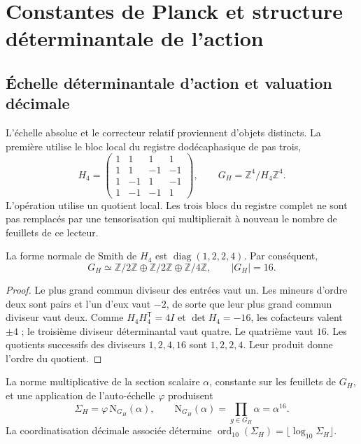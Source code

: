 \section{Constantes de Planck et structure déterminantale de l'action}
\label{v:ant:sec:action}
\subsection{Échelle déterminantale d'action et valuation décimale}

L'échelle absolue et le correcteur relatif proviennent d'objets
distincts. La première utilise le bloc local du registre dodécaphasique
de pas trois,
\begin{equation}
 H_4=\begin{pmatrix}
 1&1&1&1\\1&1&-1&-1\\1&-1&1&-1\\1&-1&-1&1
 \end{pmatrix},\qquad
 G_H=\mathbb Z^4/H_4\mathbb Z^4.
 \label{v:ant:eq:el-h4}
\end{equation}
L'opération utilise un quotient local. Les trois blocs du registre
complet ne sont pas remplacés par une tensorisation qui multiplierait à
nouveau le nombre de feuillets de ce lecteur.

\begin{lemma}
La forme normale de Smith de \(H_4\) est
\(\operatorname{diag}(1,2,2,4)\). Par conséquent,
\[
 G_H\simeq\mathbb Z/2\mathbb Z\oplus\mathbb Z/2\mathbb Z
 \oplus\mathbb Z/4\mathbb Z,\qquad |G_H|=16.
\]
\end{lemma}
\begin{proof}
Le plus grand commun diviseur des entrées vaut un. Les mineurs d'ordre deux
sont pairs et l'un d'eux vaut \(-2\), de sorte que leur plus grand commun diviseur
vaut deux. Comme \(H_4H_4^{\mathsf T}=4I\) et \(\det H_4=-16\), les
cofacteurs valent \(\pm4\) ; le troisième diviseur déterminantal vaut quatre.
Le quatrième vaut \(16\). Les quotients successifs des diviseurs
\(1,2,4,16\) sont \(1,2,2,4\). Leur produit donne l'ordre du quotient.
\end{proof}

\begin{definition}
La norme multiplicative de la section scalaire \(\alpha\), constante
sur les feuillets de \(G_H\), et une application de l'auto-échelle
\(\varphi\) produisent
\begin{equation}
 \Sigma_H=\varphi\,\mathrm N_{G_H}(\alpha),\qquad
 \mathrm N_{G_H}(\alpha)=\prod_{g\in G_H}\alpha=\alpha^{16}.
 \label{v:ant:eq:el-lector-determinantal}
\end{equation}
La coordinatisation décimale associée détermine
\(\operatorname{ord}_{10}(\Sigma_H)=\lfloor\log_{10}\Sigma_H\rfloor\).
\end{definition}

